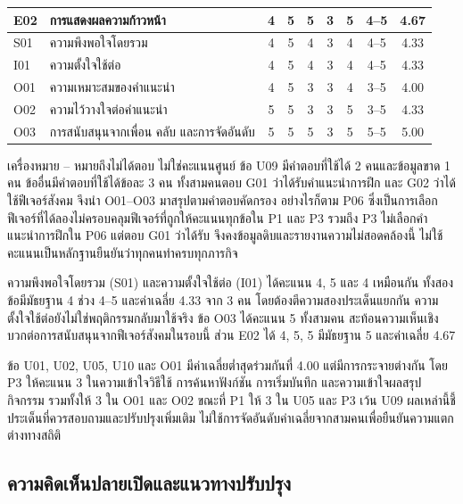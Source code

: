 \begin{longtable}{|l|>{\raggedright\arraybackslash}p{}|c|c|c|c|c|c|c|}
E02 & การแสดงผลความก้าวหน้า & 4 & 5 & 5 & 3 & 5 & 4--5 & 4.67 \\ \hline
S01 & ความพึงพอใจโดยรวม & 4 & 5 & 4 & 3 & 4 & 4--5 & 4.33 \\ \hline
I01 & ความตั้งใจใช้ต่อ & 4 & 5 & 4 & 3 & 4 & 4--5 & 4.33 \\ \hline
O01 & ความเหมาะสมของคำแนะนำ & 4 & 5 & 3 & 3 & 4 & 3--5 & 4.00 \\ \hline
O02 & ความไว้วางใจต่อคำแนะนำ & 5 & 5 & 3 & 3 & 5 & 3--5 & 4.33 \\ \hline
O03 & การสนับสนุนจากเพื่อน คลับ และการจัดอันดับ & 5 & 5 & 5 & 3 & 5 & 5--5 & 5.00 \\ \hline
\end{longtable}\endgroup

เครื่องหมาย -- หมายถึงไม่ได้ตอบ ไม่ใช่คะแนนศูนย์ ข้อ U09 มีคำตอบที่ใช้ได้ 2 คนและข้อมูลขาด 1 คน ข้ออื่นมีคำตอบที่ใช้ได้ข้อละ 3 คน ทั้งสามคนตอบ G01 ว่าได้รับคำแนะนำการฝึก และ G02 ว่าได้ใช้ฟีเจอร์สังคม จึงนำ O01--O03 มาสรุปตามคำตอบคัดกรอง อย่างไรก็ตาม P06 ซึ่งเป็นการเลือกฟีเจอร์ที่ได้ลองไม่ครอบคลุมฟีเจอร์ที่ถูกให้คะแนนทุกข้อใน P1 และ P3 รวมถึง P3 ไม่เลือกคำแนะนำการฝึกใน P06 แต่ตอบ G01 ว่าได้รับ จึงคงข้อมูลดิบและรายงานความไม่สอดคล้องนี้ ไม่ใช้คะแนนเป็นหลักฐานยืนยันว่าทุกคนทำครบทุกภารกิจ

ความพึงพอใจโดยรวม (S01) และความตั้งใจใช้ต่อ (I01) ได้คะแนน 4, 5 และ 4 เหมือนกัน ทั้งสองข้อมีมัธยฐาน 4 ช่วง 4--5 และค่าเฉลี่ย 4.33 จาก 3 คน โดยต้องตีความสองประเด็นแยกกัน ความตั้งใจใช้ต่อยังไม่ใช่พฤติกรรมกลับมาใช้จริง ข้อ O03 ได้คะแนน 5 ทั้งสามคน สะท้อนความเห็นเชิงบวกต่อการสนับสนุนจากฟีเจอร์สังคมในรอบนี้ ส่วน E02 ได้ 4, 5, 5 มีมัธยฐาน 5 และค่าเฉลี่ย 4.67

ข้อ U01, U02, U05, U10 และ O01 มีค่าเฉลี่ยต่ำสุดร่วมกันที่ 4.00 แต่มีการกระจายต่างกัน โดย P3 ให้คะแนน 3 ในความเข้าใจวิธีใช้ การค้นหาฟังก์ชัน การเริ่มบันทึก และความเข้าใจผลสรุปกิจกรรม รวมทั้งให้ 3 ใน O01 และ O02 ขณะที่ P1 ให้ 3 ใน U05 และ P3 เว้น U09 ผลเหล่านี้ชี้ประเด็นที่ควรสอบถามและปรับปรุงเพิ่มเติม ไม่ใช้การจัดอันดับค่าเฉลี่ยจากสามคนเพื่อยืนยันความแตกต่างทางสถิติ

\subsection{ความคิดเห็นปลายเปิดและแนวทางปรับปรุง}

